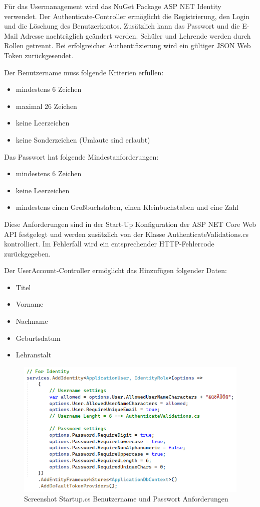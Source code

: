 Für das Usermanagement wird das NuGet Package ASP NET Identity verwendet. Der Authenticate-Controller ermöglicht die Registrierung, den Login und die Löschung des Benutzerkontos. 
Zusätzlich kann das Passwort und die E-Mail Adresse nachträglich geändert werden. Schüler und Lehrende werden durch Rollen getrennt.
Bei erfolgreicher Authentifizierung wird ein gültiger JSON Web Token zurückgesendet. 

Der Benutzername muss folgende Kriterien erfüllen:
\begin{itemize}
    \item mindestens 6 Zeichen
    \item maximal 26 Zeichen
    \item keine Leerzeichen
    \item keine Sonderzeichen (Umlaute sind erlaubt)
\end{itemize}

Das Passwort hat folgende Mindestanforderungen:
\begin{itemize}
    \item mindestens 6 Zeichen
    \item keine Leerzeichen
    \item mindestens einen Großbuchstaben, einen Kleinbuchstaben und eine Zahl
\end{itemize}

Diese Anforderungen sind in der Start-Up Konfiguration der ASP NET Core Web API festgelegt und werden zusätzlich von 
der Klasse AuthenticateValidations.cs kontrolliert. Im Fehlerfall wird ein entsprechender HTTP-Fehlercode zurückgegeben.

Der UserAccount-Controller ermöglicht das Hinzufügen folgender Daten:
\begin{itemize}
    \item Titel
    \item Vorname
    \item Nachname
    \item Geburtsdatum
    \item Lehranstalt
\end{itemize}

\begin{figure}[h]
    \includegraphics*[width=15cm]{./pics/screenshot_Startup_PwUserReq.png}
    \caption[PW User Requirements Startup]{Screenshot Startup.cs Benutzername und Passwort Anforderungen}
\end{figure}

